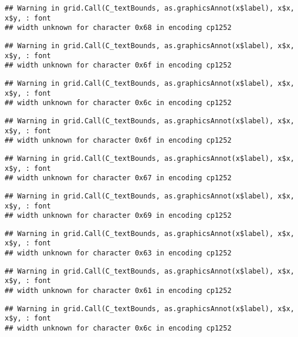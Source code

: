 \documentclass[
]{article}
\begin{document}
\begin{verbatim}
## Warning in grid.Call(C_textBounds, as.graphicsAnnot(x$label), x$x, x$y, : font
## width unknown for character 0x68 in encoding cp1252
\end{verbatim}

\begin{verbatim}
## Warning in grid.Call(C_textBounds, as.graphicsAnnot(x$label), x$x, x$y, : font
## width unknown for character 0x6f in encoding cp1252
\end{verbatim}

\begin{verbatim}
## Warning in grid.Call(C_textBounds, as.graphicsAnnot(x$label), x$x, x$y, : font
## width unknown for character 0x6c in encoding cp1252
\end{verbatim}

\begin{verbatim}
## Warning in grid.Call(C_textBounds, as.graphicsAnnot(x$label), x$x, x$y, : font
## width unknown for character 0x6f in encoding cp1252
\end{verbatim}

\begin{verbatim}
## Warning in grid.Call(C_textBounds, as.graphicsAnnot(x$label), x$x, x$y, : font
## width unknown for character 0x67 in encoding cp1252
\end{verbatim}

\begin{verbatim}
## Warning in grid.Call(C_textBounds, as.graphicsAnnot(x$label), x$x, x$y, : font
## width unknown for character 0x69 in encoding cp1252
\end{verbatim}

\begin{verbatim}
## Warning in grid.Call(C_textBounds, as.graphicsAnnot(x$label), x$x, x$y, : font
## width unknown for character 0x63 in encoding cp1252
\end{verbatim}

\begin{verbatim}
## Warning in grid.Call(C_textBounds, as.graphicsAnnot(x$label), x$x, x$y, : font
## width unknown for character 0x61 in encoding cp1252
\end{verbatim}

\begin{verbatim}
## Warning in grid.Call(C_textBounds, as.graphicsAnnot(x$label), x$x, x$y, : font
## width unknown for character 0x6c in encoding cp1252
\end{verbatim}
\end{document}
